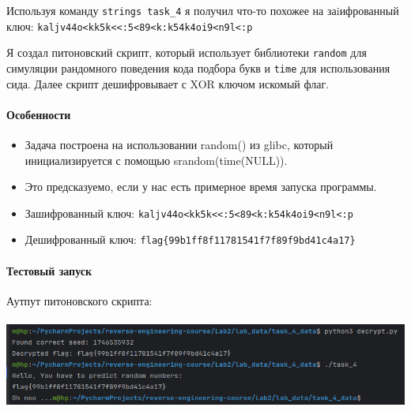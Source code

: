 Используя команду \texttt{strings task\_4} я получил что-то похожее на заiифрованный ключ: \texttt{kaljv44o<kk5k<<:5<89<k:k54k4oi9<n9l<:p}

Я создал питоновский скрипт, который использует библиотеки \texttt{random} для симуляции рандомного поведения кода
подбора букв и \texttt{time} для использования сида.
Далее скрипт дешифровывает с XOR ключом искомый флаг.

\paragraph{Особенности}
\begin{itemize}
    \item Задача построена на использовании random() из glibc, который инициализируется с помощью srandom(time(NULL)).
    \item Это предсказуемо, если у нас есть примерное время запуска программы.
    \item Зашифрованный ключ: \texttt{kaljv44o<kk5k<<:5<89<k:k54k4oi9<n9l<:p}
    \item Дешифрованный ключ: \texttt{flag\{99b1ff8f11781541f7f89f9bd41c4a17\}}
\end{itemize}

\paragraph{Тестовый запуск}
Аутпут питоновского скрипта:

\paragraph{}
\includegraphics[width=1\linewidth]{static/solution_task_4}
